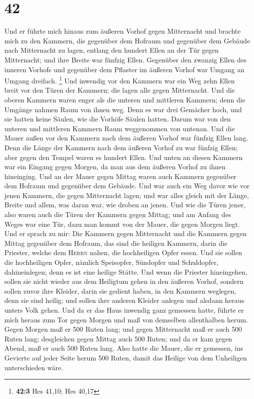 \hypertarget{section-41}{%
\section{42}\label{section-41}}

 Und er führte mich hinaus zum äußeren Vorhof gegen
Mitternacht und brachte mich zu den Kammern, die gegenüber dem Hofraum
und gegenüber dem Gebäude nach Mitternacht zu lagen, 
entlang den hundert Ellen an der Tür gegen Mitternacht; und ihre Breite
war fünfzig Ellen.  Gegenüber den zwanzig Ellen des
inneren Vorhofs und gegenüber dem Pflaster im äußeren Vorhof war Umgang
an Umgang dreifach. \footnote{\textbf{42:3} Hes 41,10; Hes 40,17}
 Und inwendig vor den Kammern war ein Weg zehn Ellen breit
vor den Türen der Kammern; die lagen alle gegen Mitternacht.
 Und die oberen Kammern waren enger als die unteren und
mittleren Kammern; denn die Umgänge nahmen Raum von ihnen weg.
 Denn es war drei Gemächer hoch, und sie hatten keine
Säulen, wie die Vorhöfe Säulen hatten. Darum war von den unteren und
mittleren Kammern Raum weggenommen von untenan.  Und die
Mauer außen vor den Kammern nach dem äußeren Vorhof war fünfzig Ellen
lang.  Denn die Länge der Kammern nach dem äußeren Vorhof
zu war fünfzig Ellen; aber gegen den Tempel waren es hundert Ellen.
 Und unten an diesen Kammern war ein Eingang gegen Morgen,
da man aus dem äußeren Vorhof zu ihnen hineinging.  Und
an der Mauer gegen Mittag waren auch Kammern gegenüber dem Hofraum und
gegenüber dem Gebäude.  Und war auch ein Weg davor wie
vor jenen Kammern, die gegen Mitternacht lagen; und war alles gleich mit
der Länge, Breite und allem, was daran war, wie droben an jenen.
 Und wie die Türen jener, also waren auch die Türen der
Kammern gegen Mittag; und am Anfang des Weges war eine Tür, dazu man
kommt von der Mauer, die gegen Morgen liegt.  Und er
sprach zu mir: Die Kammern gegen Mitternacht und die Kammern gegen
Mittag gegenüber dem Hofraum, das sind die heiligen Kammern, darin die
Priester, welche dem \textsc{Herrn} nahen, die hochheiligen Opfer essen.
Und sie sollen die hochheiligen Opfer, nämlich Speisopfer, Sündopfer und
Schuldopfer, dahineinlegen; denn es ist eine heilige Stätte.
 Und wenn die Priester hineingehen, sollen sie nicht
wieder aus dem Heiligtum gehen in den äußeren Vorhof, sondern sollen
zuvor ihre Kleider, darin sie gedient haben, in den Kammern weglegen,
denn sie sind heilig; und sollen ihre anderen Kleider anlegen und
alsdann heraus unters Volk gehen.  Und da er das Haus
inwendig ganz gemessen hatte, führte er mich heraus zum Tor gegen Morgen
und maß von demselben allenthalben herum.  Gegen Morgen
maß er 500 Ruten lang;  und gegen Mitternacht maß er auch
500 Ruten lang;  desgleichen gegen Mittag auch 500 Ruten;
 und da er kam gegen Abend, maß er auch 500 Ruten lang.
 Also hatte die Mauer, die er gemessen, ins Gevierte auf
jeder Seite herum 500 Ruten, damit das Heilige von dem Unheiligen
unterschieden wäre.

